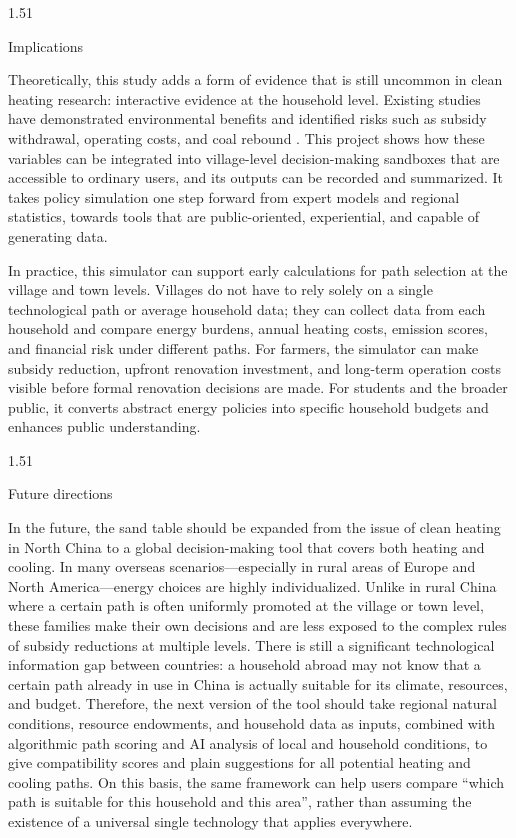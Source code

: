 \documentclass[stu,12pt,floatsintext,donotrepeattitle]{apa7}
\makeatletter
\newcommand{\Sihao}{\fontsize{14pt}{18pt}\selectfont}
\renewcommand{\subsection}{\@startsection{subsection}{2}{\z@}%
  {1.5\baselineskip}{1\baselineskip}%
  {\normalfont\Sihao\bfseries\raggedright}}
\makeatother
\begin{document}
\subsection{Implications}

Theoretically, this study adds a form of evidence that is still uncommon in clean heating research: interactive evidence at the household level. Existing studies have demonstrated environmental benefits and identified risks such as subsidy withdrawal, operating costs, and coal rebound \cite{liu2025pahs,yuan2025carbon,zhang2024uneven,zhao2024sustainable,liu2020costs,zhai2023review,hu2021decoalizing}. This project shows how these variables can be integrated into village-level decision-making sandboxes that are accessible to ordinary users, and its outputs can be recorded and summarized. It takes policy simulation one step forward from expert models and regional statistics, towards tools that are public-oriented, experiential, and capable of generating data.

In practice, this simulator can support early calculations for path selection at the village and town levels. Villages do not have to rely solely on a single technological path or average household data; they can collect data from each household and compare energy burdens, annual heating costs, emission scores, and financial risk under different paths. For farmers, the simulator can make subsidy reduction, upfront renovation investment, and long-term operation costs visible before formal renovation decisions are made. For students and the broader public, it converts abstract energy policies into specific household budgets and enhances public understanding.

\subsection{Future directions}

In the future, the sand table should be expanded from the issue of clean heating in North China to a global decision-making tool that covers both heating and cooling. In many overseas scenarios---especially in rural areas of Europe and North America---energy choices are highly individualized. Unlike in rural China where a certain path is often uniformly promoted at the village or town level, these families make their own decisions and are less exposed to the complex rules of subsidy reductions at multiple levels. There is still a significant technological information gap between countries: a household abroad may not know that a certain path already in use in China is actually suitable for its climate, resources, and budget. Therefore, the next version of the tool should take regional natural conditions, resource endowments, and household data as inputs, combined with algorithmic path scoring and AI analysis of local and household conditions, to give compatibility scores and plain suggestions for all potential heating and cooling paths. On this basis, the same framework can help users compare ``which path is suitable for this household and this area'', rather than assuming the existence of a universal single technology that applies everywhere.
\end{document}
